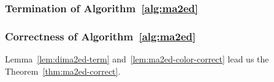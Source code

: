 \subsubsection{Termination of Algorithm~\ref{alg:ma2ed}}



\subsubsection{Correctness of Algorithm~\ref{alg:ma2ed}}

Lemma~\ref{lem:dima2ed-term} and~\ref{lem:ma2ed-color-correct} lead us the Theorem~\ref{thm:ma2ed-correct}.


